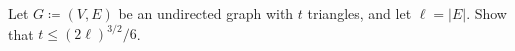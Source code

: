 Let $G \coloneqq (V, E)$ be an undirected graph with $t$ triangles, and let $\ell = |E|$. Show that $t
\le (2 \ell)^{3 / 2} / 6$.